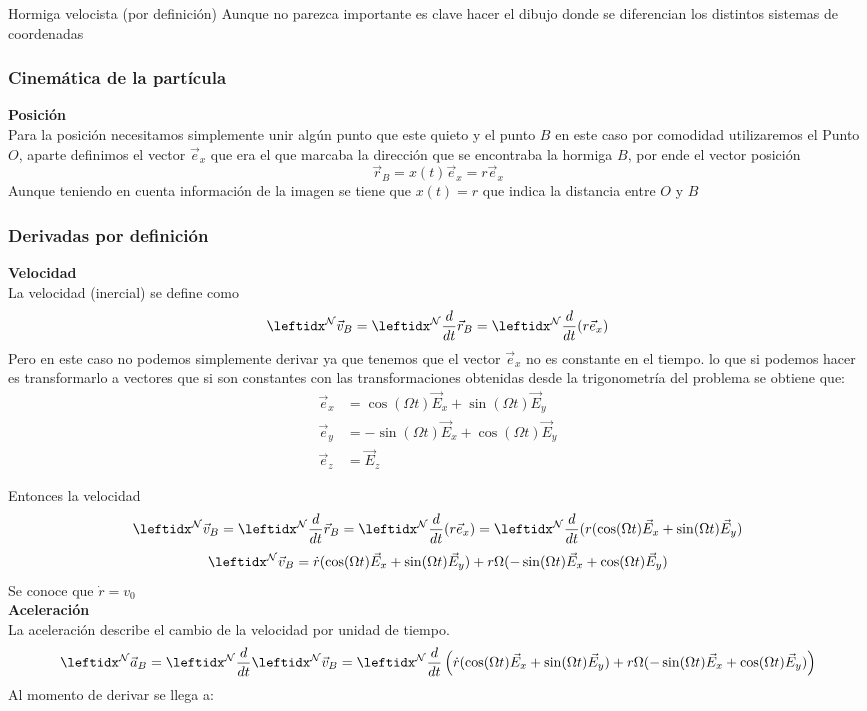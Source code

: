 \begin{solucion}{Hormiga velocista (por definición)}
Aunque no parezca importante es clave hacer el dibujo donde se diferencian los distintos sistemas de coordenadas
\subsubsection*{Cinemática de la partícula}
\textbf{Posición}\\
Para la posición necesitamos simplemente unir algún punto que este quieto y el punto $B$ en este caso por comodidad utilizaremos el Punto $O$, aparte definimos el vector $\vec{e}_x$ que era el que marcaba la dirección que se encontraba la hormiga $B$, por ende el vector posición
$$\vec{r}_B=x(t)\vec{e}_x=r\vec{e}_x$$ 
Aunque teniendo en cuenta información de la imagen se tiene que $x(t)=r$ que indica la distancia entre $O$ y $B$\\
\subsubsection*{Derivadas por definición}
\textbf{Velocidad}\\
La velocidad (inercial) se define como
$$\marc{\vec{v}_B}{N}=\der{\vec{r}_B}{N}=\der{(r\vec{e}_x)}{N}$$
Pero en este caso no podemos simplemente derivar ya que tenemos que el vector $\vec{e}_x$ no es constante en el tiempo. lo que si podemos hacer es transformarlo a vectores que si son constantes
con las transformaciones obtenidas desde la trigonometría del problema se obtiene que:
\begin{equation*}
\begin{split}
    \vec{e}_x&=\cos(\Omega t)\vec{E}_x+\sin(\Omega t)\vec{E}_y\\
    \vec{e}_y&=-\sin(\Omega t)\vec{E}_x+\cos(\Omega t)\vec{E}_y\\
    \vec{e}_z&=\vec{E}_z
\end{split}
\end{equation*}

Entonces la velocidad
$$\marc{\vec{v}_B}{N}=\der{\vec{r}_B}{N}=\der{(r\vec{e}_x)}{N}=\der{(r(\cos(\Omega t)\vec{E}_x+\sin(\Omega t)\vec{E}_y)}{N}$$
$$\marc{\vec{v}_B}{N}=\dot{r}(\cos(\Omega t)\vec{E}_x+\sin(\Omega t)\vec{E}_y)+r\Omega (-\sin(\Omega t)\vec{E}_x+\cos(\Omega t)\vec{E}_y)$$
Se conoce que $\dot{r}=v_0$\\
\textbf{Aceleración}\\
La aceleración describe el cambio de la velocidad por unidad de tiempo.\\
$$\marc{\vec{a}_B}{N}=\der{}{N}\marc{\vec{v}_B}{N}=\der{\left(\dot{r}(\cos(\Omega t)\vec{E}_x+\sin(\Omega t)\vec{E}_y)+r\Omega (-\sin(\Omega t)\vec{E}_x+\cos(\Omega t)\vec{E}_y)\right)}{N}$$
Al momento de derivar se llega a:


\end{solucion}

